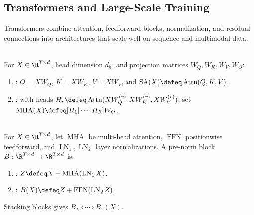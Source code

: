 \subsection{Transformers and Large-Scale Training}

Transformers combine attention, feedforward blocks, normalization, and residual connections into architectures that scale well on sequence and multimodal data.

\begin{definition} \label{def:sl-self-attention} \\
For $X\in\R^{T\times d}$, head dimension $d_h$, and projection matrices $W_Q,W_K,W_V,W_O$:
\begin{enumerate}[label=(\roman*)]
\setlength{\itemsep}{0pt}
\item {}: $Q=XW_Q$, $K=XW_K$, $V=XW_V$, and $\operatorname{SA}(X)\defeq\operatorname{Attn}(Q,K,V)$.
\item {}: with heads $H_r\defeq\operatorname{Attn}(XW_Q^{(r)},XW_K^{(r)},XW_V^{(r)})$, set $\operatorname{MHA}(X)\defeq[H_1|\cdots|H_R]W_O$.
\end{enumerate}
\end{definition}

\begin{definition} \label{def:sl-transformer-block} \\
For $X\in\R^{T\times d}$, let $\operatorname{MHA}$ be multi-head attention, $\operatorname{FFN}$ positionwise feedforward, and $\operatorname{LN}_1,\operatorname{LN}_2$ layer normalizations. A pre-norm block $B:\R^{T\times d}\to\R^{T\times d}$ is:
\begin{enumerate}[label=(\roman*)]
\setlength{\itemsep}{0pt}
\item {}: $Z\defeq X+\operatorname{MHA}(\operatorname{LN}_1X)$.
\item {}: $B(X)\defeq Z+\operatorname{FFN}(\operatorname{LN}_2Z)$.
\end{enumerate}
Stacking blocks gives $B_L\circ\cdots\circ B_1(X)$.
\end{definition}

